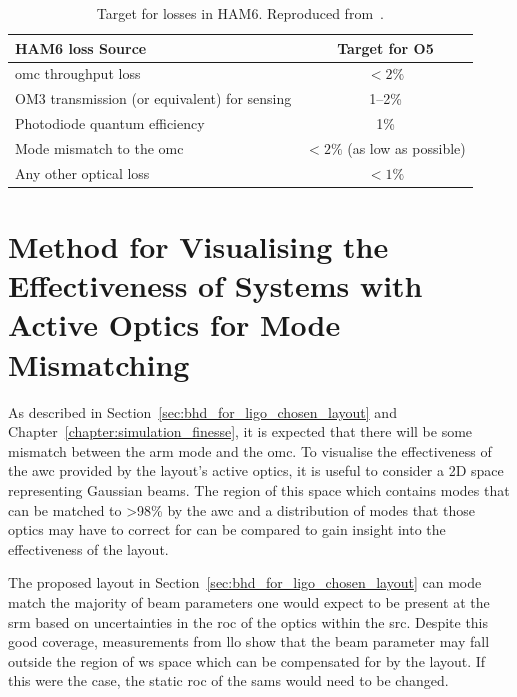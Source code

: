 \begin{table}[ht]
	\centering
	\begin{tabular}{| l | c |}
		\hline
		HAM6 loss Source & Target for O5 \\
		\hline
		\gls{omc} throughput loss & $<2\%$ \\
		OM3 transmission (or equivalent) for sensing & 1--2\% \\
		Photodiode quantum efficiency & 1\% \\
		Mode mismatch to the \gls{omc} & $<2\%$ (as low as possible) \\
		Any other optical loss & $<1\%$\\
		\hline
	\end{tabular}
	\caption[Target for losses in HAM6.]{Target for losses in HAM6. Reproduced from~\cite{A+HAM6_design_requirements}.}
	\label{tab:HAM6_losses}
\end{table}
\section{Method for Visualising the Effectiveness of Systems with Active Optics for Mode Mismatching}
\label{sec:BHD_for_ligo_WS_visulations}
As described in Section~\ref{sec:bhd_for_ligo_chosen_layout} and Chapter~\ref{chapter:simulation_finesse}, it is expected that there will be some mismatch between the arm mode and the \gls{omc}. To visualise the effectiveness of the \gls{awc} provided by the layout's active optics, it is useful to consider a 2D space representing Gaussian beams. The region of this space which contains modes that can be matched to >98\% by the \gls{awc} and a distribution of modes that those optics may have to correct for can be compared to gain insight into the effectiveness of the layout. 
\par
The proposed layout in Section~\ref{sec:bhd_for_ligo_chosen_layout} can mode match the majority of beam parameters one would expect to be present at the \gls{srm} based on uncertainties in the \gls{roc} of the optics within the \gls{src}. Despite this good coverage, measurements from \gls{llo} show that the beam parameter may fall outside the region of \gls{ws} space which can be compensated for by the layout. If this were the case, the static \gls{roc} of the \gls{sams} would need to be changed.
